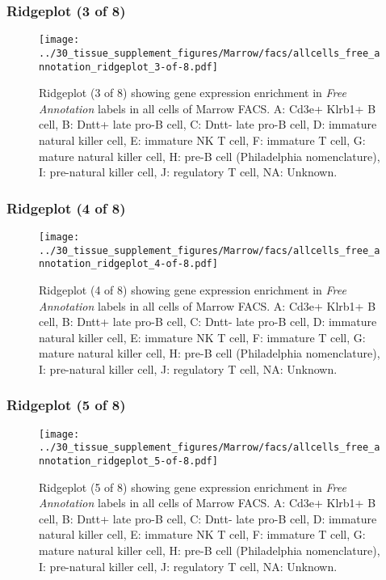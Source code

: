 \clearpage

\subsubsection{Ridgeplot (3 of 8)}
\begin{figure}[h]
\centering
\texttt{[image: ../30\_tissue\_supplement\_figures/Marrow/facs/allcells\_free\_annotation\_ridgeplot\_3-of-8.pdf]}

\caption{ Ridgeplot (3 of 8)  showing gene expression enrichment in \emph{Free Annotation} labels in all cells of Marrow FACS. A: Cd3e+ Klrb1+ B cell, B: Dntt+ late pro-B cell, C: Dntt- late pro-B cell, D: immature natural killer cell, E: immature NK T cell, F: immature T cell, G: mature natural killer cell, H: pre-B cell (Philadelphia nomenclature), I: pre-natural killer cell, J: regulatory T cell, NA: Unknown.}
\end{figure}


\clearpage

\subsubsection{Ridgeplot (4 of 8)}
\begin{figure}[h]
\centering
\texttt{[image: ../30\_tissue\_supplement\_figures/Marrow/facs/allcells\_free\_annotation\_ridgeplot\_4-of-8.pdf]}

\caption{ Ridgeplot (4 of 8)  showing gene expression enrichment in \emph{Free Annotation} labels in all cells of Marrow FACS. A: Cd3e+ Klrb1+ B cell, B: Dntt+ late pro-B cell, C: Dntt- late pro-B cell, D: immature natural killer cell, E: immature NK T cell, F: immature T cell, G: mature natural killer cell, H: pre-B cell (Philadelphia nomenclature), I: pre-natural killer cell, J: regulatory T cell, NA: Unknown.}
\end{figure}


\clearpage

\subsubsection{Ridgeplot (5 of 8)}
\begin{figure}[h]
\centering
\texttt{[image: ../30\_tissue\_supplement\_figures/Marrow/facs/allcells\_free\_annotation\_ridgeplot\_5-of-8.pdf]}

\caption{ Ridgeplot (5 of 8)  showing gene expression enrichment in \emph{Free Annotation} labels in all cells of Marrow FACS. A: Cd3e+ Klrb1+ B cell, B: Dntt+ late pro-B cell, C: Dntt- late pro-B cell, D: immature natural killer cell, E: immature NK T cell, F: immature T cell, G: mature natural killer cell, H: pre-B cell (Philadelphia nomenclature), I: pre-natural killer cell, J: regulatory T cell, NA: Unknown.}
\end{figure}


